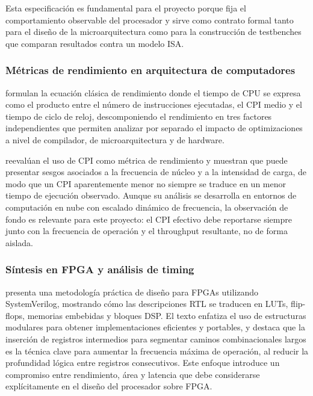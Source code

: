 Esta especificación es fundamental para el proyecto porque fija el
comportamiento observable del procesador y sirve como contrato formal tanto
para el diseño de la microarquitectura como para la construcción de testbenches
que comparan resultados contra un modelo ISA.


\subsubsection{Métricas de rendimiento en arquitectura de computadores}

\textcite{Patterson2017Computer} formulan la ecuación clásica de rendimiento
donde el tiempo de CPU se expresa como el producto entre el número de
instrucciones ejecutadas, el CPI medio y el tiempo de ciclo de reloj,
descomponiendo el rendimiento en tres factores independientes que permiten
analizar por separado el impacto de optimizaciones a nivel de compilador,
de microarquitectura y de hardware.

\textcite{Yi2020CPI} reevalúan el uso de CPI como métrica de rendimiento y
muestran que puede presentar sesgos asociados a la frecuencia de núcleo y a
la intensidad de carga, de modo que un CPI aparentemente menor no siempre se traduce en un menor tiempo de ejecución observado. Aunque su análisis se
desarrolla en entornos de computación en nube con escalado dinámico de
frecuencia, la observación de fondo es relevante para este proyecto: el CPI
efectivo debe reportarse siempre junto con la frecuencia de operación y el
throughput resultante, no de forma aislada.


\subsubsection{Síntesis en FPGA y análisis de timing}

\textcite{Chu2011FPGA} presenta una metodología práctica de diseño para FPGAs
utilizando SystemVerilog, mostrando cómo las descripciones RTL se traducen en
LUTs, flip-flops, memorias embebidas y bloques DSP. El texto enfatiza el uso
de estructuras modulares para obtener implementaciones eficientes y portables,
y destaca que la inserción de registros intermedios para segmentar caminos
combinacionales largos es la técnica clave para aumentar la frecuencia máxima
de operación, al reducir la profundidad lógica entre registros consecutivos.
Este enfoque introduce un compromiso entre rendimiento, área y latencia que
debe considerarse explícitamente en el diseño del procesador sobre
FPGA.


